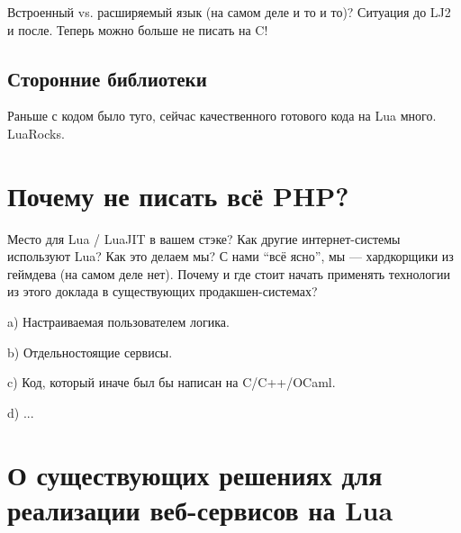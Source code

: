 \documentclass[aspectratio=169,handout]{beamer}
\begin{document}
\begin{frame}
  Встроенный vs. расширяемый язык (на самом деле и то и то)? Ситуация до LJ2 и после. Теперь можно больше не писать на C!
\end{frame}


\subsection*{Сторонние библиотеки}

\begin{frame}
  Раньше с кодом было туго, сейчас качественного готового кода на Lua много. LuaRocks.
\end{frame}


\section{Почему не писать всё PHP?}

\begin{frame}
Место для Lua / LuaJIT в вашем стэке? Как другие интернет-системы используют Lua? Как это делаем мы? С нами “всё ясно”, мы — хардкорщики из геймдева (на самом деле нет). Почему и где стоит начать применять технологии из этого доклада в существующих продакшен-системах?
\end{frame}

\begin{frame}
a) Настраиваемая пользователем логика.
\end{frame}

\begin{frame}
b) Отдельностоящие сервисы.
\end{frame}

\begin{frame}
c) Код, который иначе был бы написан на C/C++/OCaml.
\end{frame}

\begin{frame}
d) ...
\end{frame}


\section{О существующих решениях для реализации веб-сервисов на Lua}
\end{document}
